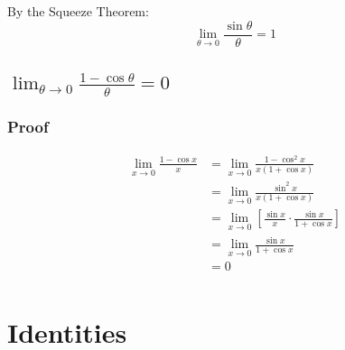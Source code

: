 \documentclass[letterpaper, landscape]{exam}
\begin{document}
  By the Squeeze Theorem:
  \[
    \lim_{\theta \to 0} \frac{\sin \theta}{\theta} = 1
  \]

  \subsection{$\lim_{\theta \to 0} \frac{1 - \cos \theta}{\theta} = 0$} %

  \subsubsection{Proof} %
  
  \begin{align*}
    \lim_{x \to 0} \frac{1 - \cos x}{x} 
      & = \lim_{x \to 0} \frac{1 - \cos^2 x}{x(1 + \cos x)} \\
      & = \lim_{x \to 0} \frac{\sin^2 x}{x(1 + \cos x)} \\
      & = \lim_{x \to 0} \left[ \frac{\sin x}{x} \cdot \frac{\sin x}{1 + \cos x} \right] \\
      & = \lim_{x \to 0} \frac{\sin x}{1 + \cos x} \\
      & = 0 \\
  \end{align*}

  

  \section{Identities} %
  
\end{document}
